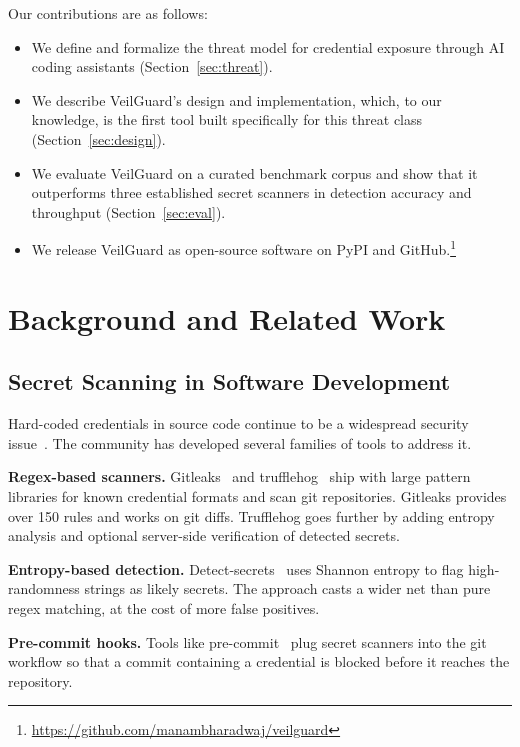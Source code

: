 \documentclass[conference]{IEEEtran}
\begin{document}
Our contributions are as follows:

\begin{itemize}
  \item We define and formalize the threat model for credential exposure through
        AI coding assistants (Section~\ref{sec:threat}).
  \item We describe VeilGuard's design and implementation, which, to our
        knowledge, is the first tool built specifically for this threat class
        (Section~\ref{sec:design}).
  \item We evaluate VeilGuard on a curated benchmark corpus and show that it
        outperforms three established secret scanners in detection accuracy and
        throughput (Section~\ref{sec:eval}).
  \item We release VeilGuard as open-source software on PyPI and
        GitHub.\footnote{\url{https://github.com/manambharadwaj/veilguard}}
\end{itemize}


\section{Background and Related Work}
\label{sec:related}

\subsection{Secret Scanning in Software Development}

Hard-coded credentials in source code continue to be a widespread security
issue~\cite{meli2019bad}. The community has developed several families of tools
to address it.

\textbf{Regex-based scanners.}
Gitleaks~\cite{gitleaks2024} and trufflehog~\cite{trufflehog2024} ship with
large pattern libraries for known credential formats and scan git repositories.
Gitleaks provides over 150 rules and works on git diffs. Trufflehog goes
further by adding entropy analysis and optional server-side verification of
detected secrets.

\textbf{Entropy-based detection.}
Detect-secrets~\cite{detectsecrets2024} uses Shannon entropy to flag
high-randomness strings as likely secrets. The approach casts a wider net than
pure regex matching, at the cost of more false positives.

\textbf{Pre-commit hooks.}
Tools like pre-commit~\cite{precommit2024} plug secret scanners into the git
workflow so that a commit containing a credential is blocked before it reaches
the repository.
\end{document}
